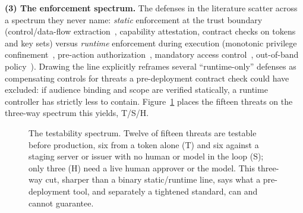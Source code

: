 \noindent\textbf{(3) The enforcement spectrum.} The defenses in the
literature scatter across a spectrum they never name: \emph{static} enforcement at the
trust boundary (control/data-flow extraction~\cite{agentauth2025camel}, capability
attestation, contract checks on tokens and key sets) versus \emph{runtime}
enforcement during execution (monotonic privilege confinement~\cite{agentauth2025progent},
pre-action authorization~\cite{agentauth2026preaction}, mandatory access
control~\cite{agentauth2026mac}, out-of-band policy~\cite{agentauth2026angels}).
Drawing the line explicitly reframes several ``runtime-only'' defenses as
compensating controls for threats a pre-deployment contract check could have
excluded: if audience binding and scope are verified statically, a runtime
controller has strictly less to contain. Figure~\ref{fig:line} places the fifteen
threats on the three-way spectrum this yields, \textsf{T}/\textsf{S}/\textsf{H}.

\begin{figure}[t]
\centering
{}
\caption{The testability spectrum. Twelve of fifteen threats are testable before
production, six from a token alone (\textsf{T}) and six against a staging server or
issuer with no human or model in the loop (\textsf{S}); only three (\textsf{H}) need a
live human approver or the model. This three-way cut, sharper than a binary
static/runtime line, says what a pre-deployment tool, and separately a tightened
standard, can and cannot guarantee.}
\label{fig:line}
\end{figure}

